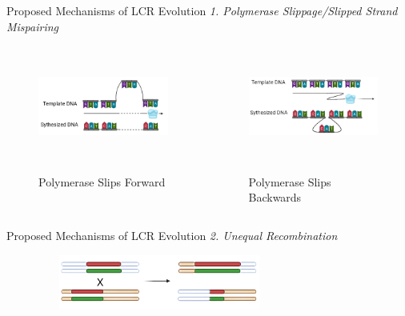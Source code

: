 \documentclass{beamer}
\begin{document}
	\begin{frame}{Proposed Mechanisms of LCR Evolution}
		\textit{1. Polymerase Slippage/Slipped Strand Mispairing}
		\begin{columns}
			
			\centering
			\begin{figure}
				\includegraphics[width=\columnwidth, height=2.5cm]{slippage2.png} \\~\\
				\caption{\centering Polymerase Slips Forward}
			\end{figure}
			
			\centering
			\begin{figure}
				\includegraphics[width=\columnwidth, height=2.5cm]{slippage1.png} \\~\\
				\caption{\centering Polymerase Slips Backwards}
			\end{figure}
		
		\end{columns}
	
	\end{frame}

	\begin{frame}{Proposed Mechanisms of LCR Evolution}
		\textit{2. Unequal Recombination} \newline\newline
		
		\begin{figure}
			\includegraphics[width=8cm, height=1.8cm]{unequal.png} \\~\\
		\end{figure}
		
	\end{frame}
	
\end{document}
